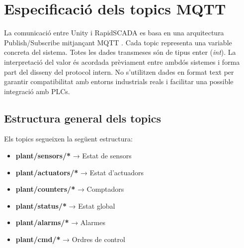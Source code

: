 \documentclass[12pt,a4paper]{report}
\begin{document}
%

\section{Especificació dels topics MQTT}

La comunicació entre Unity i RapidSCADA es basa en una arquitectura Publish/Subscribe mitjançant MQTT \cite{Team2015MQTT}. Cada topic representa una variable concreta del sistema. Totes les dades transmeses són de tipus enter (\textit{int}). La interpretació del valor és acordada prèviament entre ambdós sistemes i forma part del disseny del protocol intern. No s'utilitzen dades en format text per garantir compatibilitat amb entorns industrials reals i facilitar una possible integració amb PLCs.
\subsection{Estructura general dels topics}

Els topics segueixen la següent estructura:

\begin{itemize}
\item \textbf{plant/sensors/*} → Estat de sensors
\item \textbf{plant/actuators/*} → Estat d'actuadors
\item \textbf{plant/counters/*} → Comptadors
\item \textbf{plant/status/*} → Estat global
\item \textbf{plant/alarms/*} → Alarmes
\item \textbf{plant/cmd/*} → Ordres de control
\end{itemize}
\end{document}
